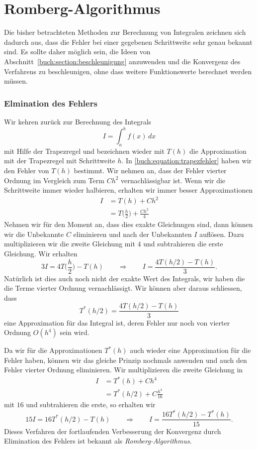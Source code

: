 %
%
%
\section{Romberg-Algorithmus
\label{buch:section:romberg}}
Die bisher betrachteten Methoden zur Berechnung von Integralen zeichnen
sich dadurch aus, dass die Fehler bei einer gegebenen Schrittweite 
sehr genau bekannt sind.
Es sollte daher möglich sein, die Ideen von
Abschnitt~\ref{buch:section:beschleunigung}
anzuwenden und die Konvergenz des Verfahrens zu beschleunigen, ohne
dass weitere Funktionswerte berechnet werden müssen.

\subsubsection{Elmination des Fehlers}
Wir kehren zurück zur Berechnung des Integrals
\[
I=\int_a^b f(x)\,dx
\]
mit Hilfe der Trapezregel und bezeichnen wieder mit $T(h)$
die Approximation mit der Trapezregel mit Schrittweite $h$.
In \eqref{buch:equation:trapezfehler} haben wir den Fehler von $T(h)$
bestimmt.
Wir nehmen an, dass der Fehler vierter Ordnung im Vergleich zum Term
$Ch^2$ vernachlässigbar ist.
Wenn wir die Schrittweite immer wieder halbieren, erhalten wir immer besser
Approximationen
\begin{align*}
I&=T(h) + Ch^2
\\
&=T\biggl(\frac{h}2\biggr) + \frac{Ch^2}{4}
\end{align*}
Nehmen wir für den Moment an, dass dies exakte Gleichungen sind, dann
können wir die Unbekannte $C$ eliminieren und nach der Unbekannten $I$
auflösen.
Dazu multiplizieren wir die zweite Gleichung mit $4$ und subtrahieren
die erste Gleichung.
Wir erhalten
\[
3I= 4T\biggl(\frac{h}2\biggr) - T(h)
\qquad\Rightarrow\qquad
I= \frac{4T(h/2) - T(h)}{3}.
\]
Natürlich ist dies auch noch nicht der exakte Wert des Integrals,
wir haben die die Terme vierter Ordnung vernachlässigt.
Wir können aber daraus schliessen, dass 
\[
T^*(h/2) = \frac{4T(h/2)-T(h)}{3}
\]
eine Approximation für das Integral ist, deren Fehler nur noch
von vierter Ordnung $O(h^4)$ sein wird.

Da wir für die Approximationen $T^*(h)$ auch wieder eine Approximation
für die Fehler haben, können wir das gleiche Prinzip nochmals anwenden
und auch den Fehler vierter Ordnung eliminieren.
Wir multiplizieren die zweite Gleichung in
\begin{align*}
I&=T^*(h) + Ch^4 \\
 &=T^*(h/2) + C\frac{h^4}{16}
\end{align*}
mit $16$ und subtrahieren die erste, so erhalten wir
\[
15I = 16T^*(h/2)-T(h)
\qquad\Rightarrow\qquad
I = \frac{16T^*(h/2)-T^*(h)}{15}.
\]
Dieses Verfahren der fortlaufenden Verbesserung der Konvergenz durch
Elimination des Fehlers ist bekannt als {\em Romberg-Algorithmus}.

